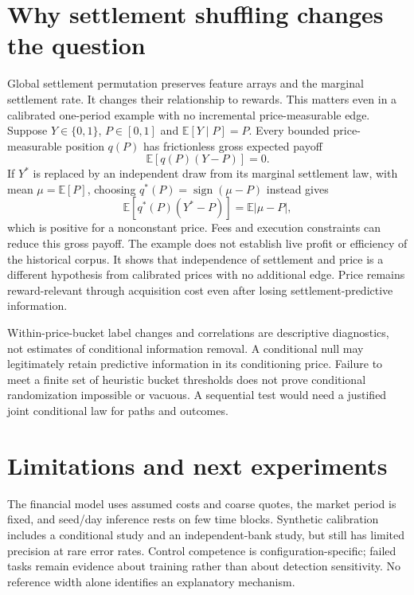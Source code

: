 \documentclass[10pt,twocolumn]{article}
\newcommand{\E}{\mathbb{E}}
\begin{document}
\section{Why settlement shuffling changes the question}
Global settlement permutation preserves feature arrays and the marginal
settlement rate. It changes their relationship to rewards. This matters even
in a calibrated one-period example with no incremental price-measurable edge.
Suppose $Y\in\{0,1\}$, $P\in[0,1]$ and $\E[Y\mid P]=P$. Every bounded
price-measurable position $q(P)$ has frictionless gross expected payoff
\begin{equation}
\E[q(P)(Y-P)]=0.
\end{equation}
If $Y^*$ is replaced by an independent draw from its marginal settlement law,
with mean $\mu=\E[P]$, choosing
$q^*(P)=\operatorname{sign}(\mu-P)$ instead gives
\begin{equation}
\E[q^*(P)(Y^*-P)]=\E|\mu-P|,
\end{equation}
which is positive for a nonconstant price. Fees and execution constraints can
reduce this gross payoff. The example does not establish live profit or
efficiency of the historical corpus. It shows that independence of settlement
and price is a different hypothesis from calibrated prices with no additional
edge. Price remains reward-relevant through acquisition cost even after losing
settlement-predictive information.

Within-price-bucket label changes and correlations are descriptive diagnostics,
not estimates of conditional information removal. A conditional null may
legitimately retain predictive information in its conditioning price. Failure
to meet a finite set of heuristic bucket thresholds does not prove conditional
randomization impossible or vacuous. A sequential test would need a justified
joint conditional law for paths and outcomes.
\fi

\section{Limitations and next experiments}
The financial model uses assumed costs and coarse quotes, the market period
is fixed, and seed/day inference rests on few time blocks. Synthetic
calibration includes a conditional study and an independent-bank study, but
still has limited precision at rare error rates. Control competence is
configuration-specific; failed tasks remain
evidence about training rather than about detection sensitivity. No reference
width alone identifies an explanatory mechanism.
\end{document}
